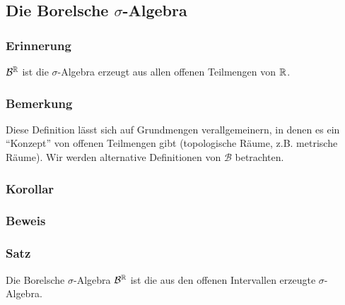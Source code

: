 \subsection{Die Borelsche $\sigma$-Algebra}
\subsubsection{Erinnerung}
$\mathcal{B}^{\mathbb{R}}$ ist die $\sigma$-Algebra erzeugt aus allen offenen Teilmengen von $\mathbb{R}$.
\subsubsection{Bemerkung}
Diese Definition l\"asst sich auf Grundmengen verallgemeinern, in denen es ein ``Konzept'' von offenen Teilmengen gibt (topologische R\"aume, z.B. metrische R\"aume). Wir werden alternative Definitionen von $\mathcal{B}$ betrachten.
\subsubsection{Korollar}
\subsubsection{Beweis}
\subsubsection{Satz}
Die Borelsche $\sigma$-Algebra $\mathcal{B}^{\mathbb{R}}$ ist die aus den offenen Intervallen erzeugte $\sigma$-Algebra.

